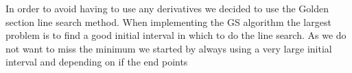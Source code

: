 In order to avoid having to use any derivatives we decided to use the Golden section line search method. When implementing the GS algorithm the largest problem is to find a good initial interval in which to do the line search. As we do not want to miss the minimum we started by always using a very large initial interval and depending on if the end points
